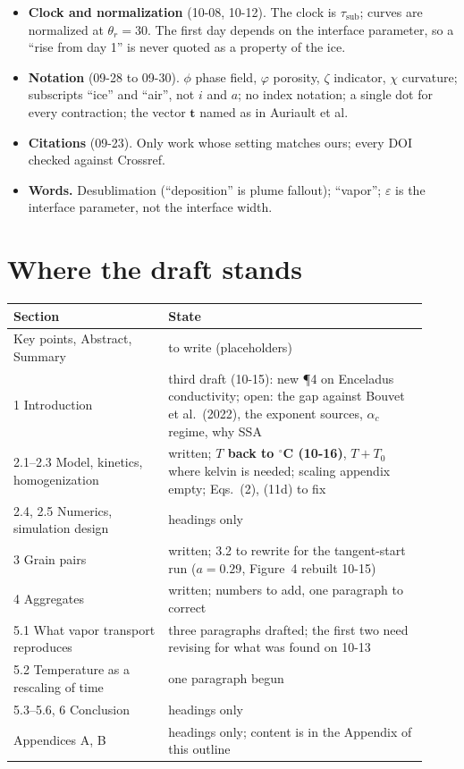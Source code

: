 \documentclass[11pt]{article}
\begin{document}
\begin{itemize}
  about the transient model. Two dimensions only, so no absolute
  $k_{\mathrm{eff}}$ is claimed.
\item \textbf{Clock and normalization} (10-08, 10-12). The clock is
  $\tau_{\mathrm{sub}}$; curves are normalized at $\theta_r = 30$. The first day depends on the interface parameter, so a
  ``rise from day 1'' is never quoted as a property of the ice.
\item \textbf{Notation} (09-28 to 09-30). $\phi$ phase field, $\varphi$
  porosity, $\zeta$ indicator, $\chi$ curvature; subscripts ``ice'' and
  ``air'', not $i$ and $a$; no index notation; a single dot for every
  contraction; the vector $\mathbf{t}$ named as in Auriault et al.
\item \textbf{Citations} (09-23). Only work whose setting matches ours;
  every DOI checked against Crossref.
\item \textbf{Words.} Desublimation (``deposition'' is plume fallout);
  ``vapor''; $\varepsilon$ is the interface parameter, not the interface
  width.
\end{itemize}

\section*{Where the draft stands}

\begin{center}\begin{tabular}{p{0.34\linewidth}p{0.58\linewidth}}\toprule
Section & State\\\midrule
Key points, Abstract, Summary & to write (placeholders)\\
1 Introduction & third draft (10-15): new \P4 on Enceladus conductivity; open: the gap against Bouvet et al.\ (2022), the exponent sources, $\alpha_c$ regime, why SSA\\
2.1--2.3 Model, kinetics, homogenization & written; \textbf{$T$ back to $^\circ$C (10-16)}, $T + T_0$ where kelvin is needed; scaling appendix empty; Eqs.~(2), (11d) to fix\\
2.4, 2.5 Numerics, simulation design & headings only\\
3 Grain pairs & written; 3.2 to rewrite for the tangent-start run ($a = 0.29$, Figure~4 rebuilt 10-15)\\
4 Aggregates & written; numbers to add, one paragraph to correct\\
5.1 What vapor transport reproduces & three paragraphs drafted; the first two need revising for what was found on 10-13\\
5.2 Temperature as a rescaling of time & one paragraph begun\\
5.3--5.6, 6 Conclusion & headings only\\
Appendices A, B & headings only; content is in the Appendix of this outline\\\bottomrule
\end{tabular}\end{center}
\end{document}
